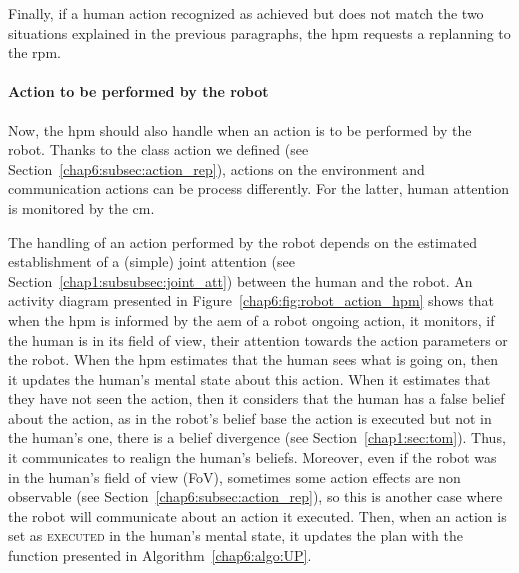 \documentclass[a4paper,11pt,twoside]{StyleThese}
\begin{document}
Finally, if a human action recognized as achieved but does not match the two situations explained in the previous paragraphs, the \acrshort{hpm} requests a replanning to the \acrshort{rpm}.


\paragraph{Action to be performed by the robot} Now, the \acrshort{hpm} should also handle when an action is to be performed by the robot. Thanks to the class action we defined (see Section~\ref{chap6:subsec:action_rep}), actions on the environment and communication actions can be process differently. For the latter, human attention is monitored by the \acrlong{cm}. 

The handling of an action performed by the robot depends on the estimated establishment of a (simple) joint attention (see Section~\ref{chap1:subsubsec:joint_att}) between the human and the robot. An activity diagram presented in Figure~\ref{chap6:fig:robot_action_hpm} shows that when the \acrshort{hpm} is informed by the \acrfull{aem} of a robot ongoing action, it monitors, if the human is in its field of view, their attention towards the action parameters or the robot. When the \acrshort{hpm} estimates that the human sees what is going on, then it updates the human's mental state about this action. When it estimates that they have not seen the action, then it considers that the human has a false belief about the action, as in the robot's belief base the action is executed but not in the human's one, there is a belief divergence (see Section~\ref{chap1:sec:tom}). Thus, it communicates to realign the human's beliefs. Moreover, even if the robot was in the human's field of view (FoV), sometimes some action effects are non observable (see Section~\ref{chap6:subsec:action_rep}), so this is another case where the robot will communicate about an action it executed. Then, when an action is set as \textsc{executed} in the human's mental state, it updates the plan with the function presented in Algorithm~\ref{chap6:algo:UP}.
\end{document}
